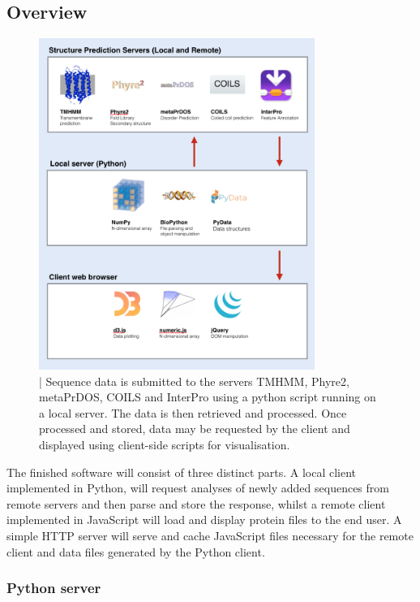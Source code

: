 \documentclass[fleqn,10pt]{article} %
\begin{document}
\subsection{Overview}

\begin{figure}
\includegraphics[width=9cm]{figs/softwareoverview}
\caption{ | Sequence data is submitted to the servers TMHMM, Phyre2, metaPrDOS, COILS and InterPro using a python script running on a local server. The data is then retrieved and processed. Once processed and stored, data may be requested by the client and displayed using client-side scripts for visualisation.}
\end{figure}

The finished software will consist of three distinct parts. A local client implemented in Python, will request analyses of newly added sequences from remote servers and then parse and store the response, whilst a remote client implemented in JavaScript will load and display protein files to the end user. A simple HTTP server will serve and cache JavaScript files necessary for the remote client and data files generated by the Python client.

\subsubsection{Python server}
\end{document}
